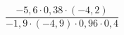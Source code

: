 \begin{ex}[type=calculate]
	\begin{condition}
		\( \dfrac{-5,6\cdot0,38\cdot(-4,2)}{-1,9\cdot(-4,9)\cdot0,96\cdot0,4} \)
	\end{condition}
	\answer{}
\end{ex}